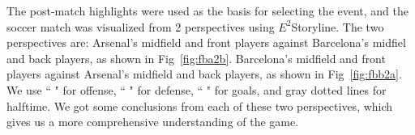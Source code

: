 \documentclass[review,journal]{vgtc}         %
\begin{document}
The post-match highlights were used as the basis for selecting the event, and the soccer match was visualized from 2 perspectives using $E^2$Storyline. The two perspectives are:  Arsenal’s midfield and front players against Barcelona’s midfiel and back players, as shown in Fig~\ref{fig:fba2b}.   Barcelona’s midfield and front players against Arsenal’s midfield and back players, as shown in Fig~\ref{fig:fbb2a}. We use ``  " for offense, `` " for defense, ``  " for goals, and gray dotted lines for halftime. We got some conclusions from each of these two perspectives, which gives us a more comprehensive understanding of the game.
\end{document}

